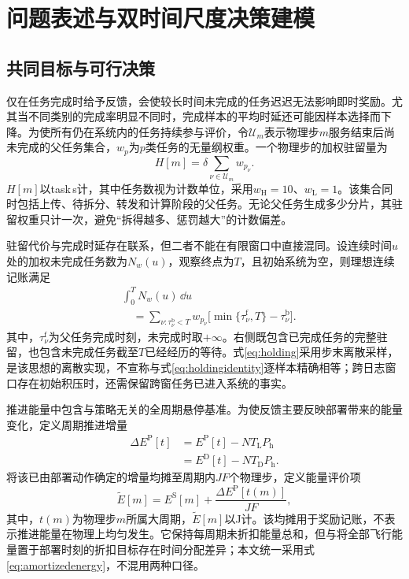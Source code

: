 \section{问题表述与双时间尺度决策建模}
\subsection{共同目标与可行决策}
仅在任务完成时给予反馈，会使较长时间未完成的任务迟迟无法影响即时奖励。尤其当不同类别的完成率明显不同时，完成样本的平均时延还可能因样本选择而下降。为使所有仍在系统内的任务持续参与评价，令$\mathcal U_m$表示物理步$m$服务结束后尚未完成的父任务集合，$w_p$为$p$类任务的无量纲权重。一个物理步的加权驻留量为
\begin{equation}
 H[m]=\delta\sum_{\nu\in\mathcal U_m}w_{p_\nu}.
 \label{eq:holding}
\end{equation}
$H[m]$以task\,s计，其中任务数视为计数单位，采用$w_{\mathrm H}=10$、$w_{\mathrm L}=1$。该集合同时包括上传、待拆分、转发和计算阶段的父任务。无论父任务生成多少分片，其驻留权重只计一次，避免“拆得越多、惩罚越大”的计数偏差。

驻留代价与完成时延存在联系，但二者不能在有限窗口中直接混同。设连续时间$u$处的加权未完成任务数为$N_w(u)$，观察终点为$T$，且初始系统为空，则理想连续记账满足
\begin{equation}
 \begin{aligned}
 &\int_0^T N_w(u)\,\dd u\\
 &\quad=\sum_{\nu:\tau_\nu^{\mathrm b}<T}
 w_{p_\nu}\big[\min\{\tau_\nu^{\mathrm f},T\}-\tau_\nu^{\mathrm b}\big].
 \end{aligned}
 \label{eq:holdingidentity}
\end{equation}
其中，$\tau_\nu^{\mathrm f}$为父任务完成时刻，未完成时取$+\infty$。右侧既包含已完成任务的完整驻留，也包含未完成任务截至$T$已经经历的等待。式\eqref{eq:holding}采用步末离散采样，是该思想的离散实现，不宣称与式\eqref{eq:holdingidentity}逐样本精确相等；跨日志窗口存在初始积压时，还需保留跨窗任务已进入系统的事实。

推进能量中包含与策略无关的全周期悬停基准。为使反馈主要反映部署带来的能量变化，定义周期推进增量
\begin{equation}
 \begin{aligned}
 \Delta E^{\mathrm P}[t]&=E^{\mathrm P}[t]-NT_{\mathrm L}P_{\mathrm h}\\
 &=E^{\mathrm D}[t]-NT_{\mathrm D}P_{\mathrm h}.
 \end{aligned}
 \label{eq:propdelta}
\end{equation}
将该已由部署动作确定的增量均摊至周期内$JF$个物理步，定义能量评价项
\begin{equation}
 \widetilde E[m]=E^{\mathrm S}[m]+
 \frac{\Delta E^{\mathrm P}[t(m)]}{JF},
 \label{eq:amortizedenergy}
\end{equation}
其中，$t(m)$为物理步$m$所属大周期，$\widetilde E[m]$以J计。该均摊用于奖励记账，不表示推进能量在物理上均匀发生。它保持每周期未折扣能量总和，但与将全部飞行能量置于部署时刻的折扣目标存在时间分配差异；本文统一采用式\eqref{eq:amortizedenergy}，不混用两种口径。

